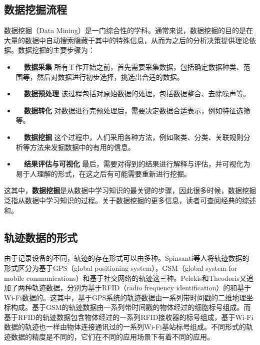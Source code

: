 \subsection{数据挖掘流程}
数据挖掘（Data Mining）是一门综合性的学科。通常来说，数据挖掘的目的是在大量的数据中自动搜索隐藏于其中的特殊信息，从而为之后的分析决策提供理论依据。数据挖掘的主要步骤为：
\vspace{4mm}
\begin{itemize}
    \item \textbf{~~数据采集} 所有工作开始之前，首先需要采集数据，包括确定数据种类、范围等，然后对数据进行初步选择，挑选出合适的数据。
    \item \textbf{~~数据预处理} 该过程包括对原始数据的处理，包括数据整合、去除噪声等。
    \item \textbf{~~数据转化} 对数据进行完预处理后，需要决定数据合适表示，例如特征选筛等。
    \item \textbf{~~数据挖掘} 这个过程中，人们采用各种方法，例如聚类、分类、关联规则分析等方法来发掘数据中的有用的信息。
    \item \textbf{~~结果评估与可视化} 最后，需要对得到的结果进行解释与评估，并可视化为易于人理解的形式，在这之后有可能需要重新进行挖掘。
\end{itemize}

\vspace{2mm}
这其中，\textbf{数据挖掘}是从数据中学习知识的最关键的步骤，因此很多时候，数据挖掘泛指从数据中学习知识的过程。关于数据挖掘的更多信息，读者可查阅经典的综述和。

\subsection{轨迹数据的形式}
由于记录设备的不同，轨迹的存在形式可以由多种。Spinsanti等人将轨迹数据的形式区分为基于GPS（global positioning system），GSM（global system for mobile communications）和基于社交网络的轨迹这三种。Pelekis和Theodoris又追加了两种轨迹数据，分别为基于RFID（radio frequency identification）的和基于Wi-Fi数据的。这其中，基于GPS系统的轨迹数据由一系列带时间戳的二维地理坐标构成。基于GSM的轨迹数据由一系列带时间戳的物体经过的细胞标号组成。而基于RFID的轨迹数据包含物体经过的一系列RFID接收器的标号组成，基于Wi-Fi数据的轨迹也一样由物体连接通讯过的一系列Wi-Fi基站标号组成。不同形式的轨迹数据的精度是不同的，它们在不同的应用场景下有着不同的应用。

